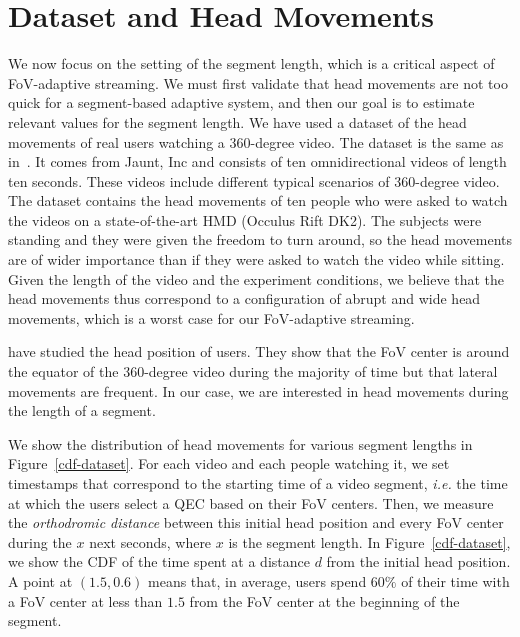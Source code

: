 \section{Dataset and Head Movements}
\label{sec:dataset}

We now focus on the setting of the segment length, which is a critical aspect of FoV-adaptive streaming.
We must first validate that head movements are not too quick for a segment-based
adaptive system, and then our goal is to
estimate relevant values for the segment length.
We have used a dataset of the head movements of real users watching
a 360-degree video. The dataset is the same as in~\cite{yu_framework_2015}. It comes from
Jaunt, Inc and consists of ten omnidirectional videos of length ten seconds. These videos include
different typical scenarios of 360-degree video. The dataset contains the head movements of
ten people who were asked to watch the videos on a state-of-the-art \ac{HMD} (Occulus Rift DK2).
The subjects were standing and they were given the freedom to turn around, so the head movements
are of wider importance than if they were asked to watch the video while sitting. Given the length of
the video and the experiment conditions, we believe that the head movements thus correspond to
a configuration of abrupt and wide head movements, which is a worst case for our FoV-adaptive streaming.

\citet{yu_framework_2015} have studied the head position of users. They show that the
FoV center is around the equator of the 360-degree video
during the majority of time but that lateral movements are frequent. In our case, we are interested in head
movements during the length of a segment.

We show the distribution of head movements for various segment lengths in Figure~\ref{cdf-dataset}.
For each video
and each people watching it, we set timestamps that correspond to the starting time of a video segment,
\textit{i.e.} the time at which the users select a QEC based on their FoV centers.
Then, we measure the \emph{orthodromic distance} between this initial head position and every FoV center
during the $x$ next seconds, where $x$ is the segment length. In Figure~\ref{cdf-dataset}, we show the \ac{CDF} of the time spent at a distance
$d$ from the initial head position. A point at $(1.5,0.6)$ means that, in average, users spend $60\%$ of
their time with a FoV center at less than $1.5$ from the FoV center at the beginning of the segment.

